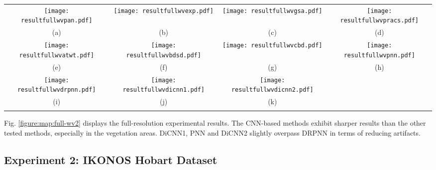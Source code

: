 \documentclass[journal]{IEEEtran}
\begin{document}
\begin{figure*}[t]\scriptsize
\centering
  \begin{tabular}{cccc}
\texttt{[image: resultfullwvpan.pdf]} &
\texttt{[image: resultfullwvexp.pdf]} &
\texttt{[image: resultfullwvgsa.pdf]} & \texttt{[image: resultfullwvpracs.pdf]} \\
(a) & (b) & (c) & (d) \\
\texttt{[image: resultfullwvatwt.pdf]} &
\texttt{[image: resultfullwvbdsd.pdf]} &
\texttt{[image: resultfullwvcbd.pdf]} &
\texttt{[image: resultfullwvpnn.pdf]} \\
(e) &(f) &(g) &(h) \\
\texttt{[image: resultfullwvdrpnn.pdf]} &
\texttt{[image: resultfullwvdicnn1.pdf]} &
\texttt{[image: resultfullwvdicnn2.pdf]} \\
(i) & (j) & (k)  \\
\\
\end{tabular}
\caption{Full-resolution pansharpening results for WorldView-2 dataset: (a) PAN image; (b) EXP; (c) GSA; (d) PRACS; (e) ATWT; (f) BDSD;  (g) GLP-CBD; (h) PNN; (i) DRPNN; (j) DiCNN1; (k) DiCNN2.}
\label{figure:map:full-wv2}
\end{figure*}

Fig. \ref{figure:map:full-wv2} displays the full-resolution experimental results. The CNN-based methods exhibit sharper results than the other tested methods, especially in the vegetation areas. DiCNN1, PNN and DiCNN2 slightly overpass DRPNN in terms of reducing artifacts.


\subsection{Experiment 2: IKONOS Hobart Dataset}
\end{document}
